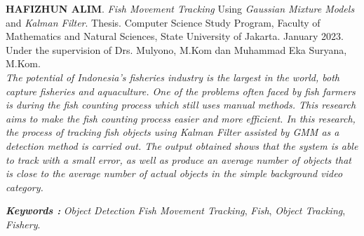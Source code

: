 \begin{abstracteng}
	
	\textbf{HAFIZHUN ALIM}. \textit{Fish Movement Tracking} Using \textit{Gaussian Mixture Models} and \textit{Kalman Filter}. Thesis. Computer Science Study Program, Faculty of Mathematics and Natural Sciences, 
	State University of Jakarta. January 2023. Under the supervision of Drs. Mulyono, M.Kom dan Muhammad Eka Suryana, M.Kom.\\
	
	\textit{The potential of Indonesia's fisheries industry is the largest in the world, both capture fisheries and aquaculture. One of the problems often faced by fish farmers is during the fish counting process which still uses manual methods. This research aims to make the fish counting process easier and more efficient. In this research, the process of \textit{tracking} fish objects using \textit{Kalman Filter} assisted by GMM as a detection method is carried out. The output obtained shows that the system is able to track with a small error, as well as produce an average number of objects that is close to the average number of actual objects in the simple background video category.}
	
	\vspace{0.5cm}
	\noindent
	\textbf{\textit{Keywords :}} \emph{Object Detection} \emph{Fish Movement Tracking}, \emph{Fish}, \emph{Object Tracking}, \emph{Fishery}. \\
	
\end{abstracteng}